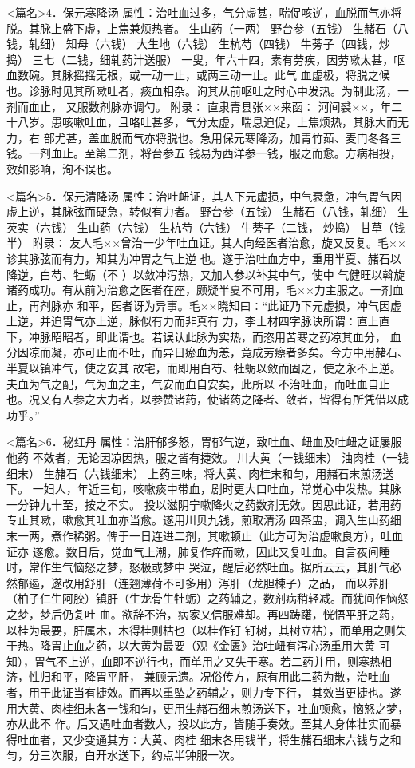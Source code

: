 \documentclass[a4paper,12pt,UTF8,twoside]{ctexbook}
\begin{document}
<篇名>4．保元寒降汤
属性：治吐血过多，气分虚甚，喘促咳逆，血脱而气亦将脱。其脉上盛下虚，上焦兼烦热者。 
生山药（一两） 野台参（五钱） 生赭石（八钱，轧细） 知母（六钱） 大生地（六钱） 生杭芍（四钱） 
牛蒡子（四钱，炒捣） 三七（二钱，细轧药汁送服） 
一叟，年六十四，素有劳疾，因劳嗽太甚，呕血数碗。其脉摇摇无根，或一动一止，或两三动一止。此气 
血虚极，将脱之候也。诊脉时见其所嗽吐者，痰血相杂。询其从前呕吐之时心中发热。为制此汤，一剂而血止， 
又服数剂脉亦调勺。 
附录∶ 
直隶青县张××来函∶ 
河间裘××，年二十八岁。患咳嗽吐血，且咯吐甚多，气分太虚，喘息迫促，上焦烦热，其脉大而无力，右 
部尤甚，盖血脱而气亦将脱也。急用保元寒降汤，加青竹茹、麦门冬各三钱。一剂血止。至第二剂，将台参五 
钱易为西洋参一钱，服之而愈。方病相投，效如影响，洵不误也。 


<篇名>5．保元清降汤
属性：治吐衄证，其人下元虚损，中气衰惫，冲气胃气因虚上逆，其脉弦而硬急，转似有力者。 
野台参（五钱） 生赭石（八钱，轧细） 生芡实（六钱） 生山药（六钱） 生杭芍（六钱） 牛蒡子（二钱， 
炒捣） 甘草（钱半） 
附录∶ 
友人毛××曾治一少年吐血证。其人向经医者治愈，旋又反复。毛××诊其脉弦而有力，知其为冲胃之气上逆 
也。遂于治吐血方中，重用半夏、赭石以降逆，白芍、牡蛎（不 ）以敛冲泻热，又加人参以补其中气，使中 
气健旺以斡旋诸药成功。有从前为治愈之医者在座，颇疑半夏不可用，毛××力主服之。一剂血止，再剂脉亦 
和平，医者讶为异事。毛××晓知曰∶“此证乃下元虚损，冲气因虚上逆，并迫胃气亦上逆，脉似有力而非真有 
力，李士材四字脉诀所谓∶直上直下，冲脉昭昭者，即此谓也。若误认此脉为实热，而恣用苦寒之药凉其血分， 
血分因凉而凝，亦可止而不吐，而异日瘀血为恙，竟成劳瘵者多矣。今方中用赭石、半夏以镇冲气，使之安其 
故宅，而即用白芍、牡蛎以敛而固之，使之永不上逆。夫血为气之配，气为血之主，气安而血自安矣，此所以 
不治吐血，而吐血自止也。况又有人参之大力者，以参赞诸药，使诸药之降者、敛者，皆得有所凭借以成功乎。” 


<篇名>6．秘红丹
属性：治肝郁多怒，胃郁气逆，致吐血、衄血及吐衄之证屡服他药 
不效者，无论因凉因热，服之皆有捷效。 
川大黄（一钱细末） 油肉桂（一钱细末） 生赭石（六钱细末） 
上药三味，将大黄、肉桂末和匀，用赭石末煎汤送下。 
一妇人，年近三旬，咳嗽痰中带血，剧时更大口吐血，常觉心中发热。其脉一分钟九十至，按之不实。 
投以滋阴宁嗽降火之药数剂无效。因思此证，若用药专止其嗽，嗽愈其吐血亦当愈。遂用川贝九钱，煎取清汤 
四茶盅，调入生山药细末一两，煮作稀粥。俾于一日连进二剂，其嗽顿止（此方可为治虚嗽良方），吐血证亦 
遂愈。数日后，觉血气上潮，肺复作痒而嗽，因此又复吐血。自言夜间睡时，常作生气恼怒之梦，怒极或梦中 
哭泣，醒后必然吐血。据所云云，其肝气必然郁遏，遂改用舒肝（连翘薄荷不可多用）泻肝（龙胆楝子）之品， 
而以养肝（柏子仁生阿胶）镇肝（生龙骨生牡蛎）之药辅之，数剂病稍轻减。而犹间作恼怒之梦，梦后仍复吐 
血。欲辞不治，病家又信服难却。再四踌躇，恍悟平肝之药，以桂为最要，肝属木，木得桂则枯也（以桂作钉 
钉树，其树立枯），而单用之则失于热。降胃止血之药，以大黄为最要（观《金匮》治吐衄有泻心汤重用大黄 
可知），胃气不上逆，血即不逆行也，而单用之又失于寒。若二药并用，则寒热相济，性归和平，降胃平肝， 
兼顾无遗。况俗传方，原有用此二药为散，治吐血者，用于此证当有捷效。而再以重坠之药辅之，则力专下行， 
其效当更捷也。遂用大黄、肉桂细末各一钱和匀，更用生赭石细末煎汤送下，吐血顿愈，恼怒之梦，亦从此不 
作。后又遇吐血者数人，投以此方，皆随手奏效。至其人身体壮实而暴得吐血者，又少变通其方∶大黄、肉桂 
细末各用钱半，将生赭石细末六钱与之和匀，分三次服，白开水送下，约点半钟服一次。 
\end{document}
